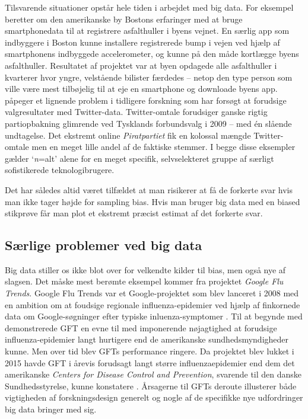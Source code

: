 \documentclass[12pt,]{article}
\begin{document}
Tilsvarende situationer opstår hele tiden i arbejdet med big data. For
eksempel beretter \citet{harford14} om den amerikanske by Bostons
erfaringer med at bruge smartphonedata til at registrere asfalthuller i
byens vejnet. En særlig app som indbyggere i Boston kunne installere
registrerede bump i vejen ved hjælp af smartphonens indbyggede
accelerometer, og kunne på den måde kortlægge byens asfalthuller.
Resultatet af projektet var at byen opdagede alle asfalthuller i
kvarterer hvor yngre, velstående bilister færdedes -- netop den type
person som ville være mest tilbøjelig til at eje en smartphone og
downloade byens app. \citet{TSSW10} påpeger et lignende problem i
tidligere forskning som har forsøgt at forudsige valgresultater med
Twitter-data. Twitter-omtale forudsiger ganske rigtig partiopbakning
glimrende ved Tysklands forbundsvalg i 2009 -- med én slående
undtagelse. Det ekstremt online \emph{Piratpartiet} fik en kolossal
mængde Twitter-omtale men en meget lille andel af de faktiske stemmer. I
begge disse eksempler gælder `\emph{n}=alt' alene for en meget specifik,
selvselekteret gruppe af særligt sofistikerede teknologibrugere.

Det har således altid været tilfældet at man risikerer at få de forkerte
svar hvis man ikke tager højde for sampling bias. Hvis man bruger big
data med en biased stikprøve får man plot et ekstremt præcist estimat af
det forkerte svar.

\hypertarget{suxe6rlige-problemer-ved-big-data}{%
\subsection{Særlige problemer ved big
data}\label{suxe6rlige-problemer-ved-big-data}}

Big data stiller os ikke blot over for velkendte kilder til bias, men
også nye af slagsen. Det måske mest berømte eksempel kommer fra
projektet \emph{Google Flu Trends}. Google Flu Trends var et
Google-projektet som blev lanceret i 2008 med en ambition om at foudsige
regionale influenza-epidemier ved hjælp af finkornede data om
Google-søgninger efter typiske inluenza-symptomer \citep{Getal2009}. Til
at begynde med demonstrerede GFT en evne til med imponerende nøjagtighed
at forudsige influenza-epidemier langt hurtigere end de amerikanske
sundhedsmyndigheder kunne. Men over tid blev GFTs performance ringere.
Da projektet blev lukket i 2015 havde GFT i årevis forudsagt langt
større influenzaepidemier end dem det amerikanske \emph{Centers for
Disease Control and Prevention}, svarende til den danske
Sundhedsstyrelse, kunne konstatere \citep{harford14}. Årsagerne til GFTs
deroute illusterer både vigtigheden af forskningsdesign generelt og
nogle af de specifikke nye udfordringer big data bringer med sig.
\end{document}
